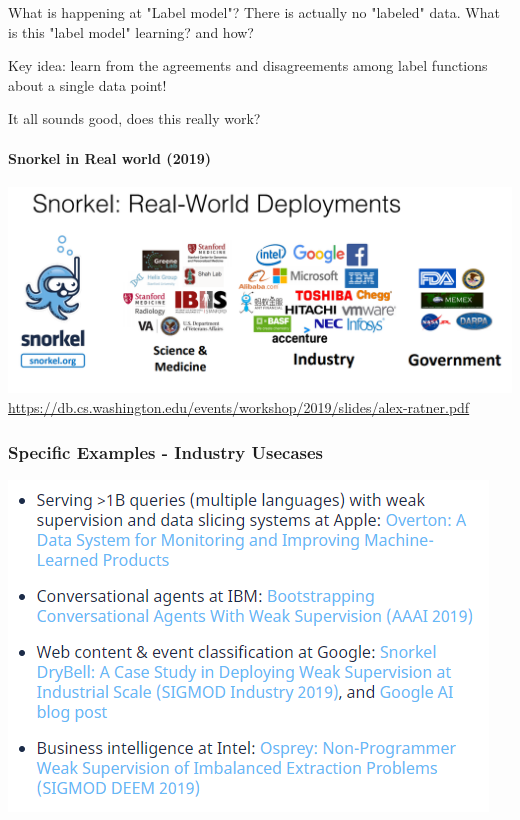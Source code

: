 \documentclass{beamer}
\begin{document}
\begin{frame}{What is happening at "Label model"?}
There is actually no "labeled" data. What is this "label model" learning? and how? \pause

\bigskip

Key idea: learn from the agreements and disagreements among label functions about a single data point!
\end{frame}

\begin{frame}{It all sounds good, does this really work?}
\framesubtitle{Snorkel in Real world (2019)}
    \includegraphics[width=\textwidth]{figures/snorkelrealworld.PNG}
    \href{Source}{https://db.cs.washington.edu/events/workshop/2019/slides/alex-ratner.pdf}
\end{frame}

\begin{frame}
\frametitle{Specific Examples - Industry Usecases}
    \includegraphics[width=\textwidth]{figures/snorkelusepapers.PNG}
\end{frame}
\end{document}
